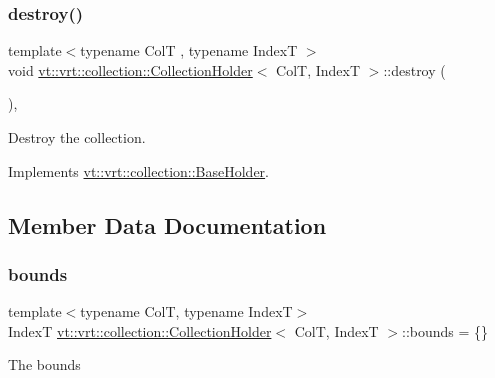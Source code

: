 \subsubsection{\texorpdfstring{destroy()}{destroy()}}
{\footnotesize\ttfamily template$<$typename ColT , typename IndexT $>$ \\
void \hyperlink{structvt_1_1vrt_1_1collection_1_1_collection_holder}{vt\+::vrt\+::collection\+::\+Collection\+Holder}$<$ ColT, IndexT $>$\+::destroy (\begin{DoxyParamCaption}{ }\end{DoxyParamCaption})\hspace{0.3cm}{\ttfamily [override]}, {\ttfamily [virtual]}}



Destroy the collection. 



Implements \hyperlink{structvt_1_1vrt_1_1collection_1_1_base_holder_a56c8289f60121e38f3699bcfafbbd491}{vt\+::vrt\+::collection\+::\+Base\+Holder}.



\subsection{Member Data Documentation}
\mbox{\label{structvt_1_1vrt_1_1collection_1_1_collection_holder_a1a3f0e52624de2c77d4d5fcd15e293eb}} 
\subsubsection{\texorpdfstring{bounds}{bounds}}
{\footnotesize\ttfamily template$<$typename ColT, typename IndexT$>$ \\
IndexT \hyperlink{structvt_1_1vrt_1_1collection_1_1_collection_holder}{vt\+::vrt\+::collection\+::\+Collection\+Holder}$<$ ColT, IndexT $>$\+::bounds = \{\}}

The bounds \mbox{\label{structvt_1_1vrt_1_1collection_1_1_collection_holder_a163ff25a81d1e0d6b3764aa0ea825aef}} 

